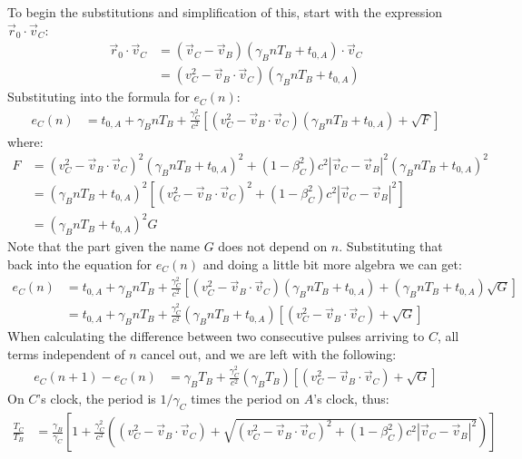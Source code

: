 \documentclass[a4paper]{article}
\theoremstyle{plain}
\theoremstyle{definition}
\newcommand{\vect}[1]{\vec{#1}}
\begin{document}
To begin the substitutions and simplification of this, start with the
expression $\vect{r}_0 \cdot \vect{v}_C$:
\begin{align*}
\vect{r}_0 \cdot \vect{v}_C
  & = (\vect{v}_C - \vect{v}_B) (\gamma_B n T_B + t_{0,A}) \cdot \vect{v}_C \\
  & = (v_C^2 - \vect{v}_B \cdot \vect{v}_C) (\gamma_B nT_B + t_{0,A})
\end{align*}
Substituting into the formula for $e_C(n)$:
\begin{align*}
e_{C}(n) & = t_{0,A} + \gamma_B nT_B + \frac{\gamma_C^2}{c^2} \left[ (v_C^2 - \vect{v}_B \cdot \vect{v}_C) (\gamma_B nT_B + t_{0,A}) + \sqrt{F} \right]
\end{align*}
where:
\begin{align*}
F & = (v_C^2 - \vect{v}_B \cdot \vect{v}_C)^2 (\gamma_B nT_B + t_{0,A})^2 + (1-\beta_C^2)c^2 |\vect{v}_C - \vect{v}_B|^2 (\gamma_B nT_B + t_{0,A})^2 \\
  & = (\gamma_B nT_B + t_{0,A})^2 \left[ (v_C^2 - \vect{v}_B \cdot \vect{v}_C)^2  + (1-\beta_C^2)c^2 |\vect{v}_C - \vect{v}_B|^2 \right] \\
  & = (\gamma_B nT_B + t_{0,A})^2 G
\end{align*}
Note that the part given the name $G$ does not depend on $n$.
Substituting that back into the equation for $e_C(n)$ and doing a little
bit more algebra we can get:
\begin{align*}
e_{C}(n)
  & = t_{0,A} + \gamma_B nT_B + \frac{\gamma_C^2}{c^2} \left[ (v_C^2 - \vect{v}_B \cdot \vect{v}_C) (\gamma_B nT_B + t_{0,A}) + (\gamma_B nT_B + t_{0,A}) \sqrt{G} \right] \\
  & = t_{0,A} + \gamma_B nT_B + \frac{\gamma_C^2}{c^2} (\gamma_B nT_B + t_{0,A}) \left[ (v_C^2 - \vect{v}_B \cdot \vect{v}_C) + \sqrt{G} \right]
\end{align*}
When calculating the difference between two consecutive pulses
arriving to $C$, all terms independent of $n$ cancel out, and we are
left with the following:
\begin{align*}
e_{C}(n+1) - e_{C}(n)
  & = \gamma_B T_B + \frac{\gamma_C^2}{c^2} (\gamma_B T_B) \left[ (v_C^2 - \vect{v}_B \cdot \vect{v}_C) + \sqrt{G} \right]
\end{align*}
On $C$'s clock, the period is $1/\gamma_C$ times the period on $A$'s
clock, thus:
\begin{align}
\frac{T_C}{T_B}
  & = \frac{\gamma_B}{\gamma_C} \left[ 1 + \frac{\gamma_C^2}{c^2} \left( (v_C^2 - \vect{v}_B \cdot \vect{v}_C) + \sqrt{(v_C^2 - \vect{v}_B \cdot \vect{v}_C)^2  + (1-\beta_C^2)c^2 |\vect{v}_C - \vect{v}_B|^2} \right) \right] \label{eqn:scen1c-TC}
\end{align}
\end{document}
